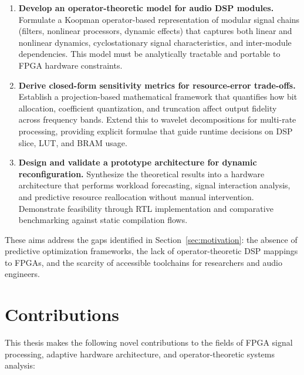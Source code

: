 \begin{enumerate}
\item \textbf{Develop an operator-theoretic model for audio DSP modules.}
Formulate a Koopman operator-based representation of modular signal chains (filters, nonlinear processors, dynamic effects) that captures both linear and nonlinear dynamics, cyclostationary signal characteristics, and inter-module dependencies. This model must be analytically tractable and portable to FPGA hardware constraints.

\item \textbf{Derive closed-form sensitivity metrics for resource-error trade-offs.}
Establish a projection-based mathematical framework that quantifies how bit allocation, coefficient quantization, and truncation affect output fidelity across frequency bands. Extend this to wavelet decompositions for multi-rate processing, providing explicit formulae that guide runtime decisions on DSP slice, LUT, and BRAM usage.

\item \textbf{Design and validate a prototype architecture for dynamic reconfiguration.}
Synthesize the theoretical results into a hardware architecture that performs workload forecasting, signal interaction analysis, and predictive resource reallocation without manual intervention. Demonstrate feasibility through RTL implementation and comparative benchmarking against static compilation flows.
\end{enumerate}

These aims address the gaps identified in Section~\ref{sec:motivation}: the absence of predictive optimization frameworks, the lack of operator-theoretic DSP mappings to FPGAs, and the scarcity of accessible toolchains for researchers and audio engineers.

\section{Contributions}

This thesis makes the following novel contributions to the fields of FPGA signal processing, adaptive hardware architecture, and operator-theoretic systems analysis:

